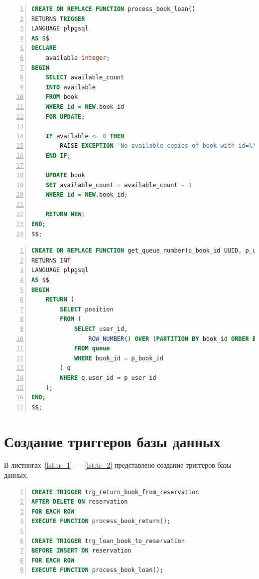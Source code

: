 \begin{center}
	\captionsetup{justification=raggedright,singlelinecheck=off}
	\begin{lstlisting}[language=sql, frame=single, numbers=left, label=lst:func_2, caption=Создание функции process\_book\_loan]
CREATE OR REPLACE FUNCTION process_book_loan()
RETURNS TRIGGER
LANGUAGE plpgsql
AS $$
DECLARE
	available integer;
BEGIN
	SELECT available_count
	INTO available
	FROM book
	WHERE id = NEW.book_id
	FOR UPDATE;
	
	IF available <= 0 THEN
		RAISE EXCEPTION 'No available copies of book with id=%', NEW.book_id;
	END IF;
	
	UPDATE book
	SET available_count = available_count - 1
	WHERE id = NEW.book_id;
	
	RETURN NEW;
END;
$$;

	\end{lstlisting}
\end{center}


\begin{center}
	\captionsetup{justification=raggedright,singlelinecheck=off}
	\begin{lstlisting}[language=sql, frame=single, numbers=left, label=lst:func_3, caption=Создание функции get\_queue\_number]
CREATE OR REPLACE FUNCTION get_queue_number(p_book_id UUID, p_user_id UUID)
RETURNS INT 
LANGUAGE plpgsql
AS $$
BEGIN
	RETURN (
		SELECT position
		FROM (
			SELECT user_id,
				ROW_NUMBER() OVER (PARTITION BY book_id ORDER BY created_at) AS position
			FROM queue
			WHERE book_id = p_book_id
		) q
		WHERE q.user_id = p_user_id
	);
END;
$$;

	\end{lstlisting}
\end{center}

\section{Создание триггеров базы данных}
В листингах~\ref{lst:tr_1} ---~\ref{lst:tr_2} представлено создание триггеров базы данных.

\begin{center}
	\captionsetup{justification=raggedright,singlelinecheck=off}
	\begin{lstlisting}[language=sql, frame=single, numbers=left, label=lst:tr_1, caption=Создание тригеров для таблицы reservation]
CREATE TRIGGER trg_return_book_from_reservation
AFTER DELETE ON reservation
FOR EACH ROW
EXECUTE FUNCTION process_book_return();
		
CREATE TRIGGER trg_loan_book_to_reservation
BEFORE INSERT ON reservation
FOR EACH ROW
EXECUTE FUNCTION process_book_loan();
	\end{lstlisting}
\end{center}


